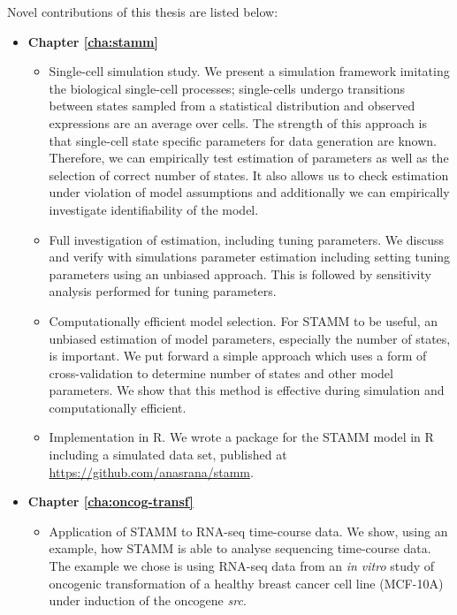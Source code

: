 \vspace*{2cm}
\noindent Novel contributions of this thesis are listed below:
\begin{itemize}
\item {\bf Chapter \ref{cha:stamm}}
\begin{itemize}
\item Single-cell simulation study. We present a simulation framework imitating the biological single-cell processes; single-cells undergo transitions between states sampled from a statistical distribution and observed expressions are an average over cells. The strength of this approach is that single-cell state specific parameters for data generation are known. Therefore, we can empirically test estimation of parameters as well as the selection of correct number of states. It also allows us to check estimation under violation of model assumptions and additionally we can empirically investigate identifiability of the model.

\item Full investigation of estimation, including tuning parameters. We discuss and verify with simulations parameter estimation including setting tuning parameters using an unbiased approach. This is followed by sensitivity analysis performed for tuning parameters.

\item Computationally efficient model selection. For STAMM to be useful, an unbiased estimation of model parameters, especially the number of states, is important. We put forward a simple approach which uses a form of cross-validation to determine number of states and other model parameters. We show that this method is effective during simulation and computationally efficient.

\item Implementation in R. We wrote a package for the STAMM model in R including a simulated data set, published at \url{https://github.com/anasrana/stamm}.

\end{itemize}

\item {\bf Chapter \ref{cha:oncog-transf}}

\begin{itemize}
\item Application of STAMM to RNA-seq time-course data.
We show, using an example, how STAMM is able to analyse sequencing time-course data. The example we chose is using RNA-seq data from an {\it in vitro} study of oncogenic transformation of a healthy breast cancer cell line (MCF-10A) under induction of the oncogene {\it src}.


\end{itemize}
\end{itemize}

